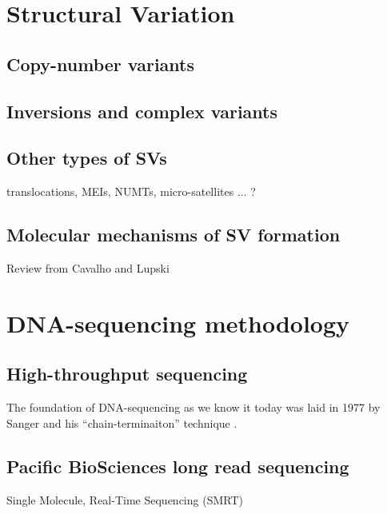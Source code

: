 \section{Structural Variation}
\label{sec:sv}

\subsection{Copy-number variants}

\subsection{Inversions and complex variants}

\subsection{Other types of SVs}
translocations, MEIs, NUMTs, micro-satellites  ... ?

\subsection{Molecular mechanisms of SV formation}
\label{sec:mechanisms}

Review from Cavalho and  Lupski \citep{Carvalho2016}



\section{DNA-sequencing methodology}


\subsection{High-throughput sequencing}
\label{sec:hts}

The foundation of DNA-sequencing as we know it today was laid in 1977 by
Sanger and his ``chain-terminaiton'' technique \citep{Sanger1977}.


\subsection{Pacific BioSciences\texorpdfstring{\textsuperscript{\textregistered}}{(R)} long read sequencing}
\label{sec:pacbio}
Single Molecule, Real-Time Sequencing (SMRT\textsuperscript{\textregistered})

